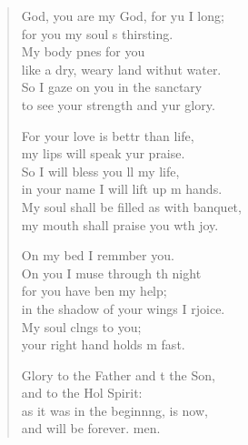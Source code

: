 \settowidth{\versewidth}{My soul shall be filled as with a banquet, *}
\begin{verse}%
  \begin{patverse}
     God, you are my God, for yu I long;\Med\\
for you my soul \pointup{\i}s thirsting.\\
My body p\pointup{\i}nes for you\Med\\
like a dry, weary land withut water.\\
So I gaze on you in the sanctary\Med\\
to see your strength and yur glory.

For your love is bettr than life,\Med\\
my lips will speak yur praise.\\
So I will bless you ll my life,\Med\\
in your name I will lift up m hands.\\
My soul shall be filled as with  banquet,\Med\\
my mouth shall praise you w\pointup{\i}th joy.

On my bed I remmber you.\Med\\
On you I muse through th night\\
for you have ben my help;\Med\\
in the shadow of your wings I rjoice.\\
My soul cl\pointup{\i}ngs to you;\Med\\
your right hand holds m fast.

Glory to the Father and t the Son,\Med\\
and to the Hol Spirit:\\
as it was in the beginn\pointup{\i}ng, is now,\Med\\
and will be forever. men.
  \end{patverse}
\end{verse}
